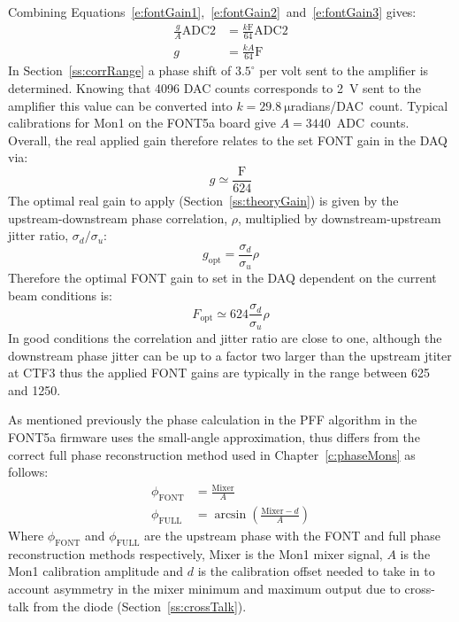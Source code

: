 Combining Equations~\ref{e:fontGain1},~\ref{e:fontGain2}~and~\ref{e:fontGain3} gives:
\begin{align}
\frac{g}{A}\mathrm{ADC2} &= \frac{k\mathrm{F}}{64}\mathrm{ADC2} \nonumber \\
g &= \frac{kA}{64}\mathrm{F} \label{e:fontGain4}
\end{align}
In Section~\ref{ss:corrRange} a phase shift of \(3.5^\circ\) per volt sent to the amplifier is determined. Knowing that 4096 DAC counts corresponds to 2~V sent to the amplifier this value can be converted into \(k = 29.8~\mathrm{\mu}\)radians/DAC~count. Typical calibrations for Mon1 on the FONT5a board give \(A = 3440\)~ADC~counts. Overall, the real applied gain therefore relates to the set FONT gain in the DAQ via:
\begin{equation}
g \simeq \frac{\mathrm{F}}{624}
\end{equation}
The optimal real gain to apply (Section~\ref{ss:theoryGain}) is given by the upstream-downstream phase correlation, \(\rho\), multiplied by downstream-upstream jitter ratio, \(\sigma_{d}/\sigma_{u}\):
\begin{equation}
g_{\mathrm{opt}} = \frac{\sigma_{d}}{\sigma_{u}} \rho  
\end{equation}
Therefore the optimal FONT gain to set in the DAQ dependent on the current beam conditions is:
\begin{equation}
F_{\mathrm{opt}} \simeq 624 \frac{\sigma_{d}}{\sigma_{u}} \rho
\end{equation}
In good conditions the correlation and jitter ratio are close to one, although the downstream phase jitter can be up to a factor two larger than the upstream jtiter at CTF3 thus the applied FONT gains are typically in the range between 625 and 1250.

As mentioned previously the phase calculation in the PFF algorithm in the FONT5a firmware uses the small-angle approximation, thus differs from the correct full phase reconstruction method used in Chapter~\ref{c:phaseMons} as follows:
\begin{align}
\phi_{\mathrm{FONT}} &= \frac{\mathrm{Mixer}}{A} \\
\phi_{\mathrm{FULL}} &= \arcsin\left(\frac{\mathrm{Mixer}-d}{A}\right)
\end{align}
Where \(\phi_{\mathrm{FONT}}\) and \(\phi_{\mathrm{FULL}}\) are the upstream phase with the FONT and full phase reconstruction methods respectively, \(\mathrm{Mixer}\) is the Mon1 mixer signal, \(A\) is the Mon1 calibration amplitude and \(d\) is the calibration offset needed to take in to account asymmetry in the mixer minimum and maximum output due to cross-talk from the diode (Section~\ref{ss:crossTalk}).

